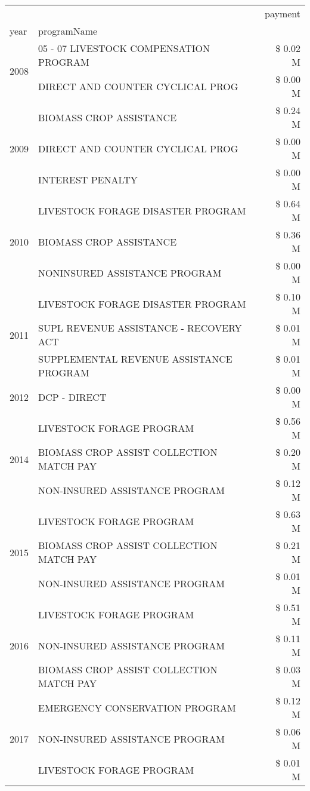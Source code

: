 \begin{tabular}{llr}
\toprule
 &  & payment \\
year & programName &  \\
\midrule
\multirow[t]{2}{*}{2008} & 05 - 07 LIVESTOCK COMPENSATION PROGRAM & \$ 0.02 M \\
 & DIRECT AND COUNTER CYCLICAL PROG & \$ 0.00 M \\
\cline{1-3}
\multirow[t]{3}{*}{2009} & BIOMASS CROP ASSISTANCE & \$ 0.24 M \\
 & DIRECT AND COUNTER CYCLICAL PROG & \$ 0.00 M \\
 & INTEREST PENALTY & \$ 0.00 M \\
\cline{1-3}
\multirow[t]{3}{*}{2010} & LIVESTOCK FORAGE DISASTER  PROGRAM & \$ 0.64 M \\
 & BIOMASS CROP ASSISTANCE & \$ 0.36 M \\
 & NONINSURED ASSISTANCE PROGRAM & \$ 0.00 M \\
\cline{1-3}
\multirow[t]{3}{*}{2011} & LIVESTOCK FORAGE DISASTER PROGRAM & \$ 0.10 M \\
 & SUPL REVENUE ASSISTANCE - RECOVERY ACT & \$ 0.01 M \\
 & SUPPLEMENTAL REVENUE ASSISTANCE PROGRAM & \$ 0.01 M \\
\cline{1-3}
2012 & DCP - DIRECT & \$ 0.00 M \\
\cline{1-3}
\multirow[t]{3}{*}{2014} & LIVESTOCK FORAGE PROGRAM & \$ 0.56 M \\
 & BIOMASS CROP ASSIST COLLECTION MATCH PAY & \$ 0.20 M \\
 & NON-INSURED ASSISTANCE PROGRAM & \$ 0.12 M \\
\cline{1-3}
\multirow[t]{3}{*}{2015} & LIVESTOCK FORAGE PROGRAM & \$ 0.63 M \\
 & BIOMASS CROP ASSIST COLLECTION MATCH PAY & \$ 0.21 M \\
 & NON-INSURED ASSISTANCE PROGRAM & \$ 0.01 M \\
\cline{1-3}
\multirow[t]{3}{*}{2016} & LIVESTOCK FORAGE PROGRAM                      & \$ 0.51 M \\
 & NON-INSURED ASSISTANCE PROGRAM                & \$ 0.11 M \\
 & BIOMASS CROP ASSIST COLLECTION MATCH PAY      & \$ 0.03 M \\
\cline{1-3}
\multirow[t]{3}{*}{2017} & EMERGENCY CONSERVATION PROGRAM & \$ 0.12 M \\
 & NON-INSURED ASSISTANCE PROGRAM & \$ 0.06 M \\
 & LIVESTOCK FORAGE PROGRAM & \$ 0.01 M \\

\end{tabular}
